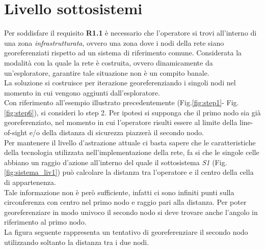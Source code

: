 \section{Livello sottosistemi}
\label{livello_sottosistemi}
Per soddisfare il requisito \textbf{R1.1} è necessario che l'operatore si trovi all'interno di una zona \textit{infrastrutturata}, ovvero una zona dove i nodi della rete siano georeferenziati rispetto ad un sistema di riferimento comune. Considerata la modalità con la quale la rete è costruita, ovvero dinamicamente da un'esploratore,  garantire tale situazione non è un compito banale.\\
La soluzione si costruisce per iterazione georeferenziando i singoli nodi nel momento in cui vengono aggiunti dall'esploratore.\\
Con riferimento all'esempio illustrato precedentemente (Fig.\ref{fig:step1}- Fig.\ref{fig:step6}), si consideri lo step 2.
Per ipotesi si supponga che il primo nodo sia già georeferenziato, nel momento in cui l'operatore risulti essere al limite della line-of-sight e/o della distanza di sicurezza piazzerà il secondo nodo. \\
Per mantenere il livello d'astrazione attuale ci basta sapere che le caratteristiche della tecnologia utilizzata nell'implementazione della rete, fa si che le singole celle abbiano un raggio d'azione all'interno del quale il sottosistema \textit{S1} (Fig.\ref{fig:sistema_liv1}) può calcolare la distanza tra l'operatore e il centro della cella di appartenenza.\\
Tale informazione non è però sufficiente, infatti ci sono infiniti punti sulla circonferenza con centro nel primo nodo e raggio pari alla distanza. Per poter georeferenziare in modo univoco il secondo nodo si deve trovare anche l'angolo in riferimento al primo nodo.\\
La figura seguente rappresenta un tentativo di georeferenziare il secondo nodo utilizzando soltanto la distanza tra i due nodi.
